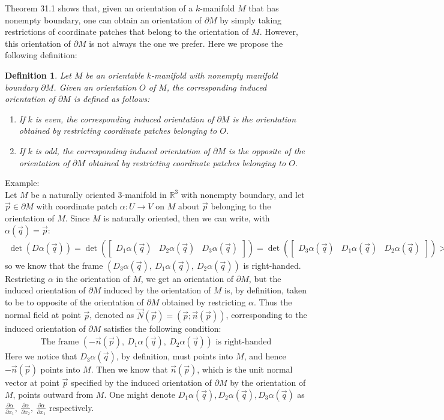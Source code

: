 \documentclass[11pt,oneside]{book}
\theoremstyle{break}
\theoremstyle{break}
\newtheorem{defn}{Definition}[corL]
\newcommand{\R}{\mathbb{R}}
\newcommand{\bmat}[1]{\begin{bmatrix} #1 \end{bmatrix}}
\newcommand{\example}{\color{green}Example: \color{black}}
\begin{document}
Theorem 31.1 shows that, given an orientation of a $k$-manifold $M$ that has nonempty boundary, one can obtain an orientation of $\partial M$ by simply taking restrictions of coordinate patches that belong to the orientation of $M$. However, this orientation of $\partial M$ is not always the one we prefer. Here we propose the following definition:
\begin{defn}
Let $M$ be an orientable $k$-manifold with nonempty manifold boundary $\partial M$. Given an orientation $O$ of $M$, the corresponding induced orientation of $\partial M$ is defined as follows:
\begin{enumerate}[topsep=3pt,itemsep=-1ex,partopsep=1ex,parsep=1ex]
\item If $k$ is even, the corresponding induced orientation of $\partial M$ is the orientation obtained by restricting coordinate patches belonging to $O$.
\item If $k$ is odd, the corresponding induced orientation of $\partial M$ is the opposite of the orientation of $\partial M$ obtained by restricting coordinate patches belonging to $O$.
\end{enumerate}
\end{defn}

\example \\
Let $M$ be a naturally oriented $3$-manifold in $\R^3$ with nonempty boundary, and let $\vec{p}\in \partial M$ with coordinate patch $\alpha: U \to V$ on $M$ about $\vec{p}$ belonging to the orientation of $M$. Since $M$ is naturally oriented, then we can write, with $\alpha(\vec{q}) = \vec{p}$:
\begin{align*}
\det(D\alpha(\vec{q})) =\det \left(\bmat{D_1\alpha(\vec{q}) & D_2\alpha(\vec{q})& D_3\alpha(\vec{q})}\right)=\det \left(\bmat{D_3\alpha(\vec{q}) & D_1\alpha(\vec{q})& D_2\alpha(\vec{q})}\right)>0
\end{align*}
so we know that the frame $( D_3\alpha(\vec{q}),\ D_1\alpha(\vec{q}),\ D_2\alpha(\vec{q}))$ is right-handed. Restricting $\alpha$ in the orientation of $M$, we get an orientation of $\partial M$, but the induced orientation of $\partial M$ induced by the orientation of $M$ is, by definition, taken to be to opposite of the orientation of $\partial M$ obtained by restricting $\alpha$. Thus the normal field at point $\vec{p}$, denoted as $\vec{N}(\vec{p}) = (\vec{p}; \vec{n}(\vec{p}))$,  corresponding to the induced orientation of $\partial M$ satisfies the following condition:
\begin{align*}
\text{The frame }\left(-\vec{n}(\vec{p}),\ D_1\alpha(\vec{q}), \ D_2\alpha(\vec{q}) \right) \text{ is right-handed}
\end{align*}
Here we notice that $D_3\alpha(\vec{q})$, by definition, must points into $M$, and hence $-\vec{n}(\vec{p})$ points into $M$. Then we know that $\vec{n}(\vec{p})$, which is the unit normal vector at point $\vec{p}$ specified by the induced orientation of $\partial M$ by the orientation of $M$, points outward from $M$. One might denote $D_1\alpha(\vec{q}), D_2\alpha(\vec{q}), D_3\alpha(\vec{q})$ as $\frac{\partial \alpha}{\partial x_1},\ \frac{\partial \alpha}{\partial x_2},\ \frac{\partial \alpha}{\partial x_1}$ respectively.
\end{document}
